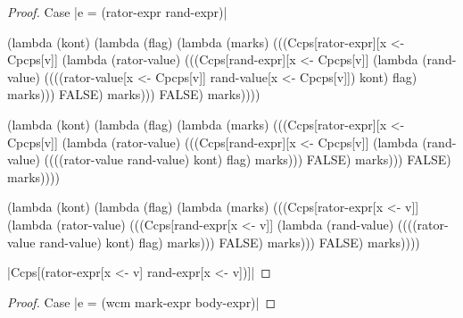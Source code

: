 \begin{proof}{Case \scheme|e = (rator-expr rand-expr)|}
\begin{schemeblock}
\begin{schemedisplay}
(lambda (kont)
   (lambda (flag)
     (lambda (marks)
       (((Ccps[rator-expr][x <- Cpcps[v]]
          (lambda (rator-value)
            (((Ccps[rand-expr][x <- Cpcps[v]]
               (lambda (rand-value)
                 ((((rator-value[x <- Cpcps[v]] rand-value[x <- Cpcps[v]]) kont) flag) marks)))
              FALSE) marks)))
         FALSE) marks))))
\end{schemedisplay}
\end{schemeblock}

\begin{schemeblock}
\begin{schemedisplay}
(lambda (kont)
   (lambda (flag)
     (lambda (marks)
       (((Ccps[rator-expr][x <- Cpcps[v]]
          (lambda (rator-value)
            (((Ccps[rand-expr][x <- Cpcps[v]]
               (lambda (rand-value)
                 ((((rator-value rand-value) kont) flag) marks)))
              FALSE) marks)))
         FALSE) marks))))
\end{schemedisplay}
\end{schemeblock}

\begin{schemeblock}
\begin{schemedisplay}
(lambda (kont)
   (lambda (flag)
     (lambda (marks)
       (((Ccps[rator-expr[x <- v]]
          (lambda (rator-value)
            (((Ccps[rand-expr[x <- v]]
               (lambda (rand-value)
                 ((((rator-value rand-value) kont) flag) marks)))
              FALSE) marks)))
         FALSE) marks))))
\end{schemedisplay}
\end{schemeblock}

\noindent
\scheme|Ccps[(rator-expr[x <- v] rand-expr[x <- v])]|
\end{proof}

\begin{proof}{Case \scheme|e = (wcm mark-expr body-expr)|}


\end{proof}

